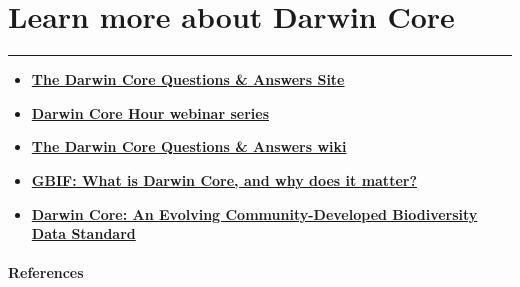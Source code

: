 \documentclass[]{book}
\theoremstyle{definition}
\theoremstyle{definition}
\theoremstyle{definition}
\theoremstyle{remark}
\begin{document}
\hypertarget{learn-more-about-darwin-core}{\chapter{Learn more about
Darwin Core}\label{learn-more-about-darwin-core}}

\begin{center}\rule{0.5\linewidth}{\linethickness}\end{center}

\begin{itemize}
\item
  \textbf{\href{https://github.com/tdwg/dwc-qa\%20target=\%22_blank\%22}{The
  Darwin Core Questions \& Answers Site}}
\item
  \textbf{\href{https://github.com/tdwg/dwc-qa/wiki/Webinars\%20target=\%22_blank\%22}{Darwin
  Core Hour webinar series}}
\item
  \textbf{\href{https://github.com/tdwg/dwc-qa/wiki\%20target=\%22_blank\%22}{The
  Darwin Core Questions \& Answers wiki}}
\item
  \textbf{\href{https://www.gbif.org/darwin-core\%20target=\%22_blank\%22}{GBIF:
  What is Darwin Core, and why does it matter?}}
\item
  \textbf{\href{https://doi.org/10.1371/journal.pone.0029715\%20target=\%22_blank\%22}{Darwin
  Core: An Evolving Community-Developed Biodiversity Data Standard}
  \citep{DwC-paper} }
\end{itemize}

\subsubsection*{References}\label{references-1}


\end{document}
